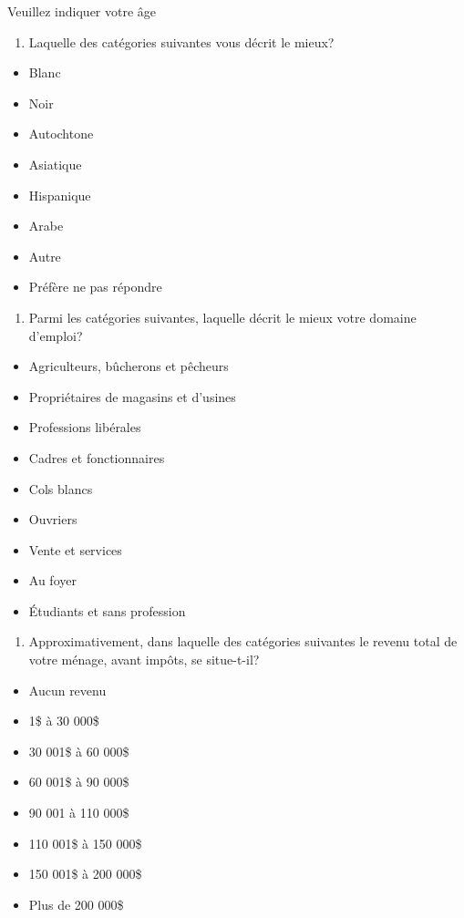\documentclass[
  letterpaper,
  DIV=11,
  numbers=noendperiod]{scrreprt}
\providecommand{\tightlist}{%
  \setlength{\itemsep}{0pt}\setlength{\parskip}{0pt}}\usepackage{longtable,booktabs,array}
\begin{document}
Veuillez indiquer votre âge

\begin{enumerate}
\def\labelenumi{\arabic{enumi}.}
\setcounter{enumi}{3}
\tightlist
\item
  Laquelle des catégories suivantes vous décrit le mieux?
\end{enumerate}

\begin{itemize}
\tightlist
\item
  Blanc
\item
  Noir
\item
  Autochtone
\item
  Asiatique
\item
  Hispanique
\item
  Arabe
\item
  Autre
\item
  Préfère ne pas répondre
\end{itemize}

\begin{enumerate}
\def\labelenumi{\arabic{enumi}.}
\setcounter{enumi}{4}
\tightlist
\item
  Parmi les catégories suivantes, laquelle décrit le mieux votre domaine
  d'emploi?
\end{enumerate}

\begin{itemize}
\tightlist
\item
  Agriculteurs, bûcherons et pêcheurs
\item
  Propriétaires de magasins et d'usines
\item
  Professions libérales
\item
  Cadres et fonctionnaires
\item
  Cols blancs
\item
  Ouvriers
\item
  Vente et services
\item
  Au foyer
\item
  Étudiants et sans profession
\end{itemize}

\begin{enumerate}
\def\labelenumi{\arabic{enumi}.}
\setcounter{enumi}{5}
\tightlist
\item
  Approximativement, dans laquelle des catégories suivantes le revenu
  total de votre ménage, avant impôts, se situe-t-il?
\end{enumerate}

\begin{itemize}
\tightlist
\item
  Aucun revenu
\item
  1\$ à 30 000\$
\item
  30 001\$ à 60 000\$
\item
  60 001\$ à 90 000\$
\item
  90 001 à 110 000\$
\item
  110 001\$ à 150 000\$
\item
  150 001\$ à 200 000\$
\item
  Plus de 200 000\$
\end{itemize}
\end{document}
